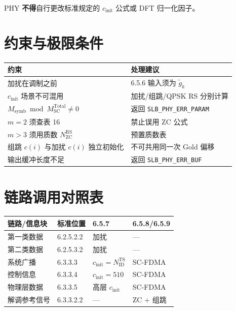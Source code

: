 \documentclass[11pt,a4paper]{ctexart}
\begin{document}
PHY \textbf{不得}自行更改标准规定的 $c_{\mathrm{init}}$ 公式或 DFT 归一化因子。

\section{约束与极限条件}

\begin{table}[h]
\centering
\small
\begin{tabular}{p{4.5cm}p{9.5cm}}
\toprule
\textbf{约束} & \textbf{处理建议} \\
\midrule
加扰在调制之前 & 6.5.6 输入须为 $\tilde{g}_k$ \\
$c_{\mathrm{init}}$ 场景不可混用 & 加扰/组跳/QPSK RS 分别计算 \\
$M_{\mathrm{symb}}\bmod M_{\mathrm{SC}}^{\mathrm{Total}}\neq 0$ & 返回 \texttt{SLB\_PHY\_ERR\_PARAM} \\
$m=2$ 须查表 16 & 禁止误用 ZC 公式 \\
$m>3$ 须用质数 $N_{\mathrm{ZC}}^{\mathrm{RS}}$ & 预置质数表 \\
组跳 $c(i)$ 与加扰 $c(i)$ 独立初始化 & 不可共用同一次 Gold 偏移 \\
输出缓冲长度不足 & 返回 \texttt{SLB\_PHY\_ERR\_BUF} \\
\bottomrule
\end{tabular}
\end{table}

\section{链路调用对照表}

\begin{table}[h]
\centering
\small
\begin{tabular}{llll}
\toprule
\textbf{链路/信息块} & \textbf{标准位置} & \textbf{6.5.7} & \textbf{6.5.8/6.5.9} \\
\midrule
第一类数据 & 6.2.5.2.2 & 加扰 & --- \\
第二类数据 & 6.2.5.3.2 & 加扰 & --- \\
系统广播 & 6.3.3.3 & $c_{\mathrm{init}}=N_{\mathrm{ID}}^{\mathrm{TS}}$ & SC-FDMA \\
控制信息 & 6.3.3.4 & $c_{\mathrm{init}}=510$ & SC-FDMA \\
物理层数据 & 6.3.3.5 & 高层 $c_{\mathrm{init}}$ & SC-FDMA \\
解调参考信号 & 6.3.3.2.2 & --- & ZC + 组跳 \\
\bottomrule
\end{tabular}
\end{table}
\end{document}
